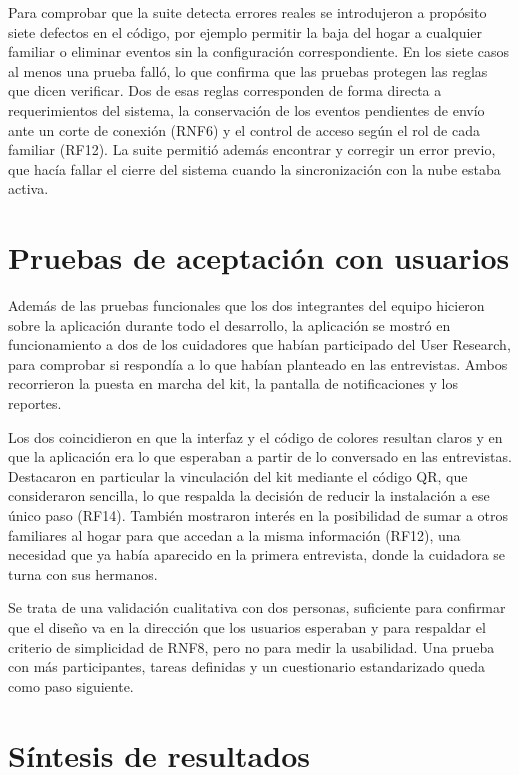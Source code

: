 Para comprobar que la suite detecta errores reales se introdujeron a propósito siete defectos en el código, por ejemplo permitir la baja del hogar a cualquier familiar o eliminar eventos sin la configuración correspondiente.
En los siete casos al menos una prueba falló, lo que confirma que las pruebas protegen las reglas que dicen verificar.
Dos de esas reglas corresponden de forma directa a requerimientos del sistema, la conservación de los eventos pendientes de envío ante un corte de conexión (RNF6) y el control de acceso según el rol de cada familiar (RF12).
La suite permitió además encontrar y corregir un error previo, que hacía fallar el cierre del sistema cuando la sincronización con la nube estaba activa.

\section{Pruebas de aceptación con usuarios}
\label{sec:pruebas_usuarios}

Además de las pruebas funcionales que los dos integrantes del equipo hicieron sobre la aplicación durante todo el desarrollo, la aplicación se mostró en funcionamiento a dos de los cuidadores que habían participado del User Research, para comprobar si respondía a lo que habían planteado en las entrevistas.
Ambos recorrieron la puesta en marcha del kit, la pantalla de notificaciones y los reportes.

Los dos coincidieron en que la interfaz y el código de colores resultan claros y en que la aplicación era lo que esperaban a partir de lo conversado en las entrevistas.
Destacaron en particular la vinculación del kit mediante el código QR, que consideraron sencilla, lo que respalda la decisión de reducir la instalación a ese único paso (RF14).
También mostraron interés en la posibilidad de sumar a otros familiares al hogar para que accedan a la misma información (RF12), una necesidad que ya había aparecido en la primera entrevista, donde la cuidadora se turna con sus hermanos.

Se trata de una validación cualitativa con dos personas, suficiente para confirmar que el diseño va en la dirección que los usuarios esperaban y para respaldar el criterio de simplicidad de RNF8, pero no para medir la usabilidad.
Una prueba con más participantes, tareas definidas y un cuestionario estandarizado queda como paso siguiente.

\section{Síntesis de resultados}


